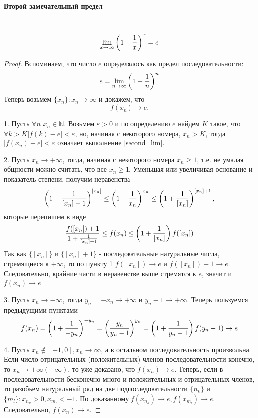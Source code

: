 \documentclass{article}
\let\vanillaparagraph\paragraph
\renewcommand{\paragraph}[1]{\vanillaparagraph{#1}\mbox{}\\}
\begin{document}
\paragraph{Второй замечательный предел}
\begin{equation}
\lim_{x\to\infty} \left( 1 + \frac{1} {x} \right) ^x = e\notag
\end{equation}
\begin{proof}
Вспоминаем, что число $e$ определялось как предел последовательности:
\begin{equation}
e = \lim_{n\to\infty}\left(1 + \frac{1} {n} \right) ^n \notag
\end{equation}
Теперь возьмем $\{x_n\}: x_n \to \infty$ и докажем, что 
\begin{equation}\label{second_lim}
f(x_n) \to e.
\end{equation}
\item 1. Пусть $\forall n$ $ x_n \in \mathbb{N}$. Возьмем $\varepsilon > 0$ и по определению $e$ найдем $K$ такое, что $\forall k > K |f(k) - e| < \varepsilon$, но, начиная с некоторого номера, $x_n > K$, тогда $|f(x_n) - e| < \varepsilon$ означает выполнение \eqref{second_lim}.
\item 2. Пусть $x_n \to +\infty$, тогда, начиная с некоторого номера $x_n \geq 1$, т.е. не умалая общности можно считать, что все $x_n \geq 1$. Уменьшая или увеличивая основание и показатель степени, получим неравенства
\begin{equation}
\left(1 + \frac{1}{[x_n] + 1}\right)^{[x_n]} \leq \left( 1 + \frac{1}{x_n}\right)^{x_n} \leq \left( 1 + \frac{1} {[x_n]}\right)^{[x_n] + 1},\notag
\end{equation}
которые перепишем в  виде
\begin{equation}
\frac{f([x_n] )+ 1} {1 + \frac{1}{[x_n] + 1}} \leq f(x_n) \leq \left( 1 + \frac{1}{[x_n]}\right)f([x_n])\notag
\end{equation}
Так как $\{[x_n]\}$ и $\{[x_n] + 1\}$ - последовательные натуральные числа, стремящиеся к $+\infty$, то по пункту 1 $f([x_n]) \to e $ и $f([x_n]) + 1 \to e$. Следовательно, крайние части в неравенстве выше стремятся к $e$, значит и $f(x_n) \to e$
\item 3. Пусть $x_n \to -\infty$, тогда $y_n = -x_n \to +\infty$ и $y_n - 1 \to +\infty$. Теперь пользуемся предыдущими пунктами
\begin{equation}
f(x_n) = \left(1 + \frac{1} {-y_n}\right)^{-y_n} = \left(\frac{y_n} {y_n - 1}\right)^{y_n} = \left(1 + \frac{1} {y_n - 1}\right) f(y_n - 1) \to e \notag
\end{equation}
\item 4. Пусть $x_n \notin [-1, 0], x_n \to \infty$, а в остальном последовательность произвольна. Если число отрицательных (положительных) членов последовательности конечно, то $x_n \to +\infty (-\infty)$, то уже доказано, что $f(x_n) \to e$. Теперь, если в последовательности бесконечно много и положительных и отрицательных членов, то разобьем натуральный ряд на две подпоследовательности $\{n_k\}$ и $\{m_l\}: x_{n_k} > 0, x_{m_l}< -1$. По доказанному $f(x_{n_k})\to e, f(x_{m_l})\to e$. Следовательно, $f(x_n) \to e$.
\end{proof}
\end{document}
